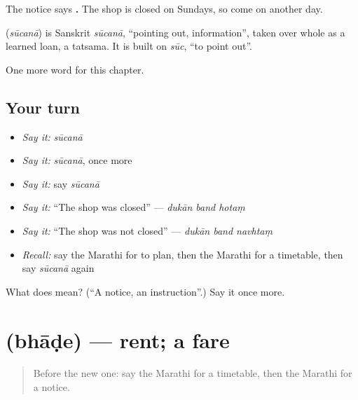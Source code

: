 The notice says \textbf{  .} The shop is closed on Sundays, so come on another day.

\begin{cousinweb}
\textbf{} (\emph{sūcanā}) is Sanskrit \emph{sūcanā}, \textquotedblleft{}pointing out, information\textquotedblright{}, taken over whole as a learned loan, a tatsama. It is built on \emph{sūc}, \textquotedblleft{}to point out\textquotedblright{}.
\end{cousinweb}

\begin{grammarlens}[title={What you've built}]
One more word for this chapter.
\end{grammarlens}

\subsection*{Your turn}
\begin{itemize}
\raggedright
  \item \emph{Say it:} \emph{sūcanā}
  \item \emph{Say it:} \emph{sūcanā}, once more
  \item \emph{Say it:} say \emph{sūcanā}
  \item \emph{Say it:} \textquotedblleft{}The shop was closed\textquotedblright{} — \emph{dukān band hotaṃ}
  \item \emph{Say it:} \textquotedblleft{}The shop was not closed\textquotedblright{} — \emph{dukān band navhtaṃ}
  \item \emph{Recall:} say the Marathi for to plan, then the Marathi for a timetable, then say \emph{sūcanā} again
\end{itemize}

\begin{tcolorbox}[breakable,colback=teal!4,colframe=teal!35!black,title={Before you move on}]
What does  mean? (\textquotedblleft{}A notice, an instruction\textquotedblright{}.) Say it once more.
\end{tcolorbox}
\section[\texorpdfstring{\mr{भाडे} (bhāḍe)}{भाडे (bhāḍe)}]{ (bhāḍe) — rent; a fare}

\label{lesson:MR-C161-bhade}



\begin{quote}
Before the new one: say the Marathi for a timetable, then the Marathi for a notice.
\end{quote}

